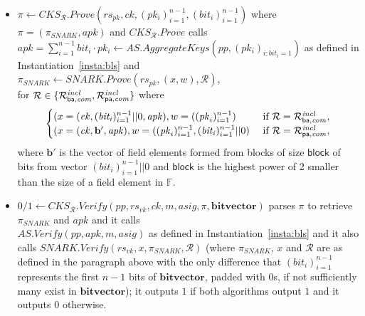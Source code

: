 \begin{construction}
\begin{itemize}
\item $\pi \leftarrow \mathit{CKS_{\mathcal{R}}.Prove}
(\mathit{rs}_{\mathit{pk}}, \mathit{ck}, (\mathit{pk_i})_{i=1}^{n-1}, (\mathit{bit_i})_{i=1}^{n-1})$ 
where $ \pi = (\pi_{SNARK}, \mathit{apk})$ and $\mathit{CKS_{\mathcal{R}}.Prove}$ calls \\ 
$\mathit{apk} = \sum_{i=1}^{n-1} \mathit{bit_i} \cdot \mathit{pk_i} \leftarrow \mathit{AS.AggregateKeys}(\mathit{pp}, (\mathit{pk_i})_{i:\mathit{bit_i = 1}})$ 
as defined in Instantiation~\ref{insta:bls} and \\ $\pi_{SNARK} \leftarrow \mathit{SNARK.Prove}(\mathit{rs_{pk}}, (x,w), \mathcal{R})$, \\ 
for $\mathcal{R} \in \{\mathcal{R}^{\mathit{incl}}_{\mathsf{ba},\mathit{com}}, \mathcal{R}^{\mathit{incl}}_{\mathsf{pa},\mathit{com}} \}$ where 
\begin{equation*}
\begin{cases}
 (x = (\mathit{ck}, (\mathit{bit_i})_{i=1}^{n-1}||0, \mathit{apk}), w = ((\mathit{pk}_i)_{i=1}^{n-1}) & \text{ if } \mathcal{R} = \mathcal{R}^{\mathit{incl}}_{\mathsf{ba},\mathit{com}},\\
 (x = (\mathit{ck}, \mathbf{b'}, \mathit{apk}), w = ((\mathit{pk}_i)_{i=1}^{n-1}, (\mathit{bit_i})_{i=1}^{n-1}||0) & \text{ if } \mathcal{R} = \mathcal{R}^{\mathit{incl}}_{\mathsf{pa},\mathit{com}}, \\
\end{cases}       
\end{equation*}
where $\mathbf{b'}$ is the vector of field elements formed from blocks of size $\mathsf{block}$ of bits from vector 
$(\mathit{bit_i})_{i=1}^{n-1}||0$ and $\mathsf{block}$ is the highest power of 2 smaller than the size of a field element in $\mathbb{F}$. 

\item $0/1 \leftarrow \mathit{CKS_{\mathcal{R}}.Verify}(\mathit{pp}, \mathit{rs}_{\mathit{vk}}, \mathit{ck}, m, \mathit{asig}, \pi, \mathbf{bitvector})$ 
parses $\pi$ to retrieve $\pi_{\mathit{SNARK}}$ and $\mathit{apk}$ and it calls \\$\mathit{AS.Verify(\mathit{pp}, \mathit{apk}, m, \mathit{asig})}$ 
as defined in Instantiation~\ref{insta:bls} and it also calls $\mathit{SNARK.Verify}(\mathit{rs_{vk}}, x, \pi_{\mathit{SNARK}}, \mathcal{R})$ 
(where $\pi_{\mathit{SNARK}}$, $x$ and $\mathcal{R}$ are as defined in the paragraph above with the only difference that $(\mathit{bit_i})_{i=1}^{n-1}$ 
represents the first $n-1$ bits of $\mathbf{bitvector}$, padded with $0$s, if not sufficiently many exist in $\mathbf{bitvector}$); 
it outputs $1$ if both algorithms output $1$ and it outputs $0$ otherwise.
\end{itemize}
\end{construction}
